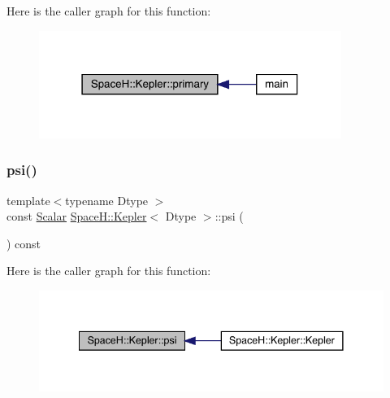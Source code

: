 Here is the caller graph for this function\+:
\nopagebreak
\begin{figure}[H]
\begin{center}
\leavevmode
\includegraphics[width=279pt]{struct_space_h_1_1_kepler_a4eec4730b416c39c431ec3251e869aaa_icgraph}
\end{center}
\end{figure}
\mbox{\label{struct_space_h_1_1_kepler_a053b7309d6296ff35c16a0fd4450e3d5}} 
\subsubsection{\texorpdfstring{psi()}{psi()}}
{\footnotesize\ttfamily template$<$typename Dtype $>$ \\
const \mbox{\hyperlink{struct_space_h_1_1_kepler_a19291f268209f594a96fb4828fa1a54c}{Scalar}} \mbox{\hyperlink{struct_space_h_1_1_kepler}{Space\+H\+::\+Kepler}}$<$ Dtype $>$\+::psi (\begin{DoxyParamCaption}{ }\end{DoxyParamCaption}) const\hspace{0.3cm}{\ttfamily [inline]}}

Here is the caller graph for this function\+:
\nopagebreak
\begin{figure}[H]
\begin{center}
\leavevmode
\includegraphics[width=341pt]{struct_space_h_1_1_kepler_a053b7309d6296ff35c16a0fd4450e3d5_icgraph}
\end{center}
\end{figure}
\mbox{\label{struct_space_h_1_1_kepler_ac8d49ec22dd42341e73a289a818ae0ac}} 
